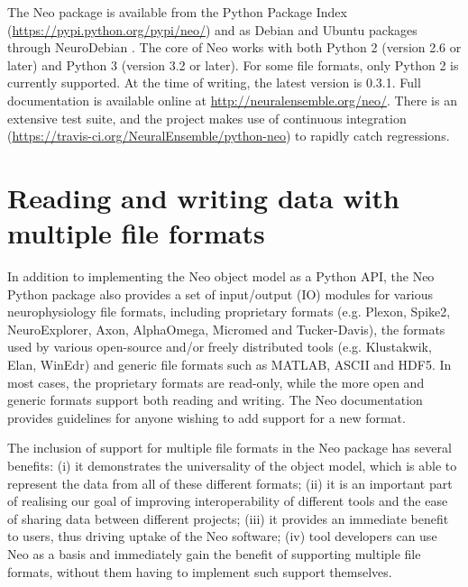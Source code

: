 \documentclass{frontiers}
\newcommand{\documentation}{\url{http://neuralensemble.org/neo/}}
\begin{document}
The Neo package is available from the Python Package Index (\url{https://pypi.python.org/pypi/neo/}) and as Debian and Ubuntu packages through NeuroDebian \citep{Halchenko2012}.
The core of Neo works with both Python 2 (version 2.6 or later) and Python 3 (version 3.2 or later).
For some file formats, only Python 2 is currently supported. At the time of writing, the latest version is 0.3.1.
Full documentation is available online at \documentation.
There is an extensive test suite, and the project makes use of continuous integration (\url{https://travis-ci.org/NeuralEnsemble/python-neo}) to rapidly catch regressions.


\section{Reading and writing data with multiple file formats}


In addition to implementing the Neo object model as a Python API, the Neo Python package also provides a set of input/output (IO) modules for various neurophysiology file formats, including proprietary formats (e.g. Plexon, Spike2, NeuroExplorer, Axon, AlphaOmega, Micromed and Tucker-Davis), the formats used by various open-source and/or freely distributed tools (e.g. Klustakwik, Elan, WinEdr) and generic file formats such as MATLAB, ASCII and HDF5. 
In most cases, the proprietary formats are read-only, while the more open and generic formats support both reading and writing. The Neo documentation provides guidelines for anyone wishing to add support for a new format.

The inclusion of support for multiple file formats in the Neo package has several benefits:
(i) it demonstrates the universality of the object model, which is able to represent the data from all of these different formats;
(ii) it is an important part of realising our goal of improving interoperability of different tools and the ease of sharing data between different projects;
(iii) it provides an immediate benefit to users, thus driving uptake of the Neo software;
(iv) tool developers can use Neo as a basis and immediately gain the benefit of supporting multiple file formats, without them having to implement such support themselves.
\end{document}
